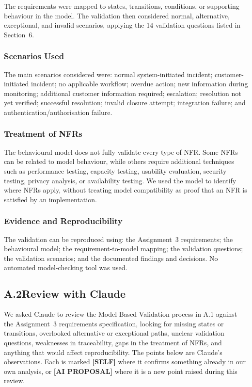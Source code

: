 \documentclass[11pt,a4paper]{article}
\begin{document}
The requirements were mapped to states, transitions, conditions, or supporting behaviour in the model. The validation then considered normal, alternative, exceptional, and invalid scenarios, applying the 14 validation questions listed in Section~6.

\subsubsection*{Scenarios Used}

The main scenarios considered were: normal system-initiated incident; customer-initiated incident; no applicable workflow; overdue action; new information during monitoring; additional customer information required; escalation; resolution not yet verified; successful resolution; invalid closure attempt; integration failure; and authentication/authorisation failure.

\subsubsection*{Treatment of NFRs}

The behavioural model does not fully validate every type of NFR. Some NFRs can be related to model behaviour, while others require additional techniques such as performance testing, capacity testing, usability evaluation, security testing, privacy analysis, or availability testing. We used the model to identify where NFRs apply, without treating model compatibility as proof that an NFR is satisfied by an implementation.

\subsubsection*{Evidence and Reproducibility}

The validation can be reproduced using: the Assignment~3 requirements; the behavioural model; the requirement-to-model mapping; the validation questions; the validation scenarios; and the documented findings and decisions. No automated model-checking tool was used.

\vspace{8pt}
\subsection*{A.2\enspace Review with Claude}

We asked Claude to review the Model-Based Validation process in A.1 against the Assignment~3 requirements specification, looking for missing states or transitions, overlooked alternative or exceptional paths, unclear validation questions, weaknesses in traceability, gaps in the treatment of NFRs, and anything that would affect reproducibility. The points below are Claude's observations. Each is marked \textbf{[SELF]} where it confirms something already in our own analysis, or \textbf{[AI PROPOSAL]} where it is a new point raised during this review.
\end{document}
